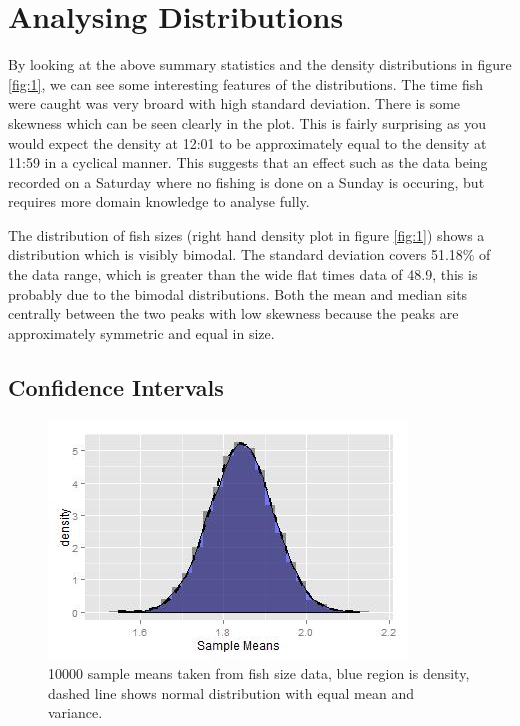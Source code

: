 \documentclass{article}
\begin{document}
\section{Analysing Distributions}

By looking at the above summary statistics and the density distributions in figure \ref{fig:1}, we can see some interesting features of the distributions. The time fish were caught was very broard with high standard deviation. There is some skewness which can be seen clearly in the plot. This is fairly surprising as you would expect the density at 12:01 to be approximately equal to the density at 11:59 in a cyclical manner. This suggests that an effect such as the data being recorded on a Saturday where no fishing is done on a Sunday is occuring, but requires more domain knowledge to analyse fully.

The distribution of fish sizes (right hand density plot in figure \ref{fig:1}) shows a distribution which is visibly bimodal. The standard deviation covers 51.18\% of the data range, which is greater than the wide flat times data of 48.9, this is probably due to the bimodal distributions. Both the mean and median sits centrally between the two peaks with low skewness because the peaks are approximately symmetric and equal in size. 

\subsection{Confidence Intervals}


\begin{figure}
  \includegraphics[width=0.9\linewidth]{figure3.jpg}
  \caption{10000 sample means taken from fish size data, blue region is density, dashed line shows normal distribution with equal mean and variance.}
  \label{fig:three}
\end{figure}
\end{document}
